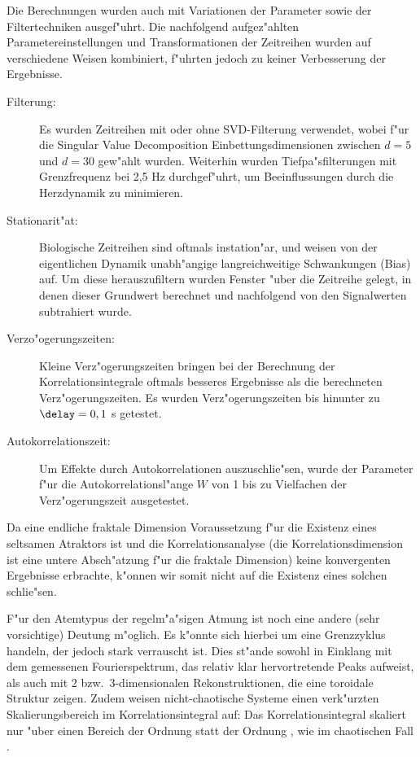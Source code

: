 Die Berechnungen wurden auch mit Variationen der Parameter sowie der Filtertechniken
ausgef"uhrt. Die nachfolgend aufgez"ahlten Parametereinstellungen und Transformationen der
Zeitreihen wurden auf verschiedene Weisen kombiniert, f"uhrten jedoch zu keiner
Verbesserung der Ergebnisse.
\begin{description}
\item[Filterung:] Es wurden Zeitreihen mit oder ohne SVD-Filterung verwendet, wobei f"ur
  die Singular Value Decomposition Einbettungsdimensionen zwischen $d=5$ und $d=30$
  gew"ahlt wurden. Weiterhin wurden Tiefpa"sfilterungen mit Grenzfrequenz bei 2,5 Hz
  durchgef"uhrt, um Beeinflussungen durch die Herzdynamik zu minimieren.
\item[Stationarit"at:] Biologische Zeitreihen sind oftmals instation"ar, und weisen von
  der eigentlichen Dynamik unabh"angige langreichweitige Schwankungen (Bias) auf. 
  Um diese herauszufiltern wurden Fenster "uber die Zeitreihe gelegt, in denen dieser
  Grundwert berechnet und nachfolgend von den Signalwerten subtrahiert wurde.
\item[Verzo"ogerungszeiten:] Kleine Verz"ogerungszeiten bringen bei der Berechnung der
  Korrelationsintegrale oftmals besseres Ergebnisse als die berechneten
  Verz"ogerungszeiten. Es wurden Verz"ogerungszeiten bis hinunter zu $\delay=0,1$ s
  getestet.
\item[Autokorrelationszeit:] Um Effekte durch Autokorrelationen auszuschlie"sen, wurde
  der Parameter f"ur die Autokorrelationsl"ange $W$ von 1 bis zu Vielfachen der
  Verz"ogerungszeit ausgetestet.
\end{description}
Da eine endliche fraktale Dimension Voraussetzung f"ur die Existenz eines seltsamen
Atraktors ist und die Korrelationsanalyse (die Korrelationsdimension ist eine untere
Absch"atzung f"ur die fraktale Dimension) keine konvergenten Ergebnisse erbrachte, k"onnen wir somit
nicht auf die Existenz eines solchen schlie"sen. 

F"ur den Atemtypus der regelm"a"sigen Atmung ist noch eine andere (sehr vorsichtige)
Deutung m"oglich. Es k"onnte sich hierbei um eine Grenzzyklus handeln, der jedoch stark
verrauscht ist. Dies st"ande sowohl in Einklang mit dem gemessenen Fourierspektrum, das
relativ klar hervortretende Peaks aufweist, als auch mit 2 bzw.\ 3-dimensionalen
Rekonstruktionen, die eine toroidale Struktur zeigen. Zudem weisen nicht-chaotische Systeme
einen verk"urzten Skalierungsbereich im Korrelationsintegral auf: Das Korrelationsintegral
skaliert nur "uber einen Bereich der Ordnung  statt der Ordnung , wie
im chaotischen Fall \cite{Theiler}.

